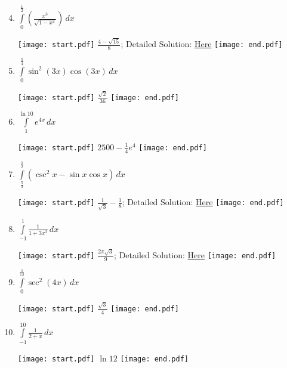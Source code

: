 \documentclass[12pt]{article}
\begin{document}

\begin{enumerate}
\setcounter{enumi}{3}

\item $\int\limits_{0}^{\frac{1}{2}}\left(\frac{x^3}{\sqrt{1-x^4}}\right)\,dx$ 

\texttt{[image: start.pdf]}
{{$\frac{4-\sqrt{15}}{8}$; Detailed Solution: \textcolor{blue}{\href{http://www.math.drexel.edu/classes/Calculus/resources/Math122HW/Solutions/122_06_Substitution_Definite_04.pdf}{Here}}}}
\texttt{[image: end.pdf]}


\item $\int\limits_{0}^{\frac{\pi}{4}} \sin^{2}(3x)\cos{(3x)}\,dx$ 

\texttt{[image: start.pdf]}
{{$\frac{\sqrt{2}}{36}$}}
\texttt{[image: end.pdf]}


\item $\int\limits_{1}^{\ln{10}}e^{4x}\,dx$ 

\texttt{[image: start.pdf]}
{{$2500-\frac{1}{4}e^{4}$}}
\texttt{[image: end.pdf]}


\item $\int\limits_{\frac{\pi}{3}}^{\frac{\pi}{2}}(\csc^{2}{x}-\sin{x}\cos{x})\,dx$ 

\texttt{[image: start.pdf]}
{{$\frac{1}{\sqrt{3}}-\frac{1}{8}$; Detailed Solution: \textcolor{blue}{\href{http://www.math.drexel.edu/classes/Calculus/resources/Math122HW/Solutions/122_06_Substitution_Definite_07.pdf}{Here}}}}
\texttt{[image: end.pdf]}


\item $\int\limits_{-1}^{1}\frac{1}{1+3x^2}\,dx$ 

\texttt{[image: start.pdf]}
{{$\frac{2\pi\sqrt{3}}{9}$; Detailed Solution: \textcolor{blue}{\href{http://www.math.drexel.edu/classes/Calculus/resources/Math122HW/Solutions/122_06_Substitution_Definite_08.pdf}{Here}}}}
\texttt{[image: end.pdf]}


\item $\int\limits_{0}^{\frac{\pi}{12}} \sec^2{(4x)}\,dx$ 

\texttt{[image: start.pdf]}
{{$\frac{\sqrt{3}}{4}$}}
\texttt{[image: end.pdf]}


\item $\int\limits_{-1}^{10}\frac{1}{2+x}\,dx$ 

\texttt{[image: start.pdf]}
{{$\ln{12}$}}
\texttt{[image: end.pdf]}



\end{enumerate}
\end{document}
